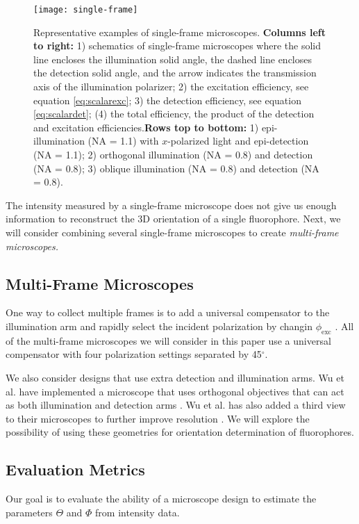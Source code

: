 \documentclass[10pt]{article}
\begin{document}
\begin{figure}[htbp]
\centering\texttt{[image: single-frame]}
\caption{Representative examples of single-frame microscopes.\newline \newline
  \textbf{Columns left to right:} 1) schematics of single-frame microscopes
  where the solid line encloses the illumination solid angle, the dashed line
  encloses the detection solid angle, and the arrow indicates the transmission
  axis of the illumination polarizer; 2) the excitation efficiency, see equation
  \ref{eq:scalarexc}; 3) the detection efficiency, see equation
  \ref{eq:scalardet}; (4) the total efficiency, the product of the detection and
  excitation efficiencies.\newline \newline \textbf{Rows top to bottom:} 1)
  epi-illumination (NA = 1.1) with $x$-polarized light and epi-detection (NA =
  1.1); 2) orthogonal illumination (NA = 0.8) and detection (NA = 0.8); 3)
  oblique illumination (NA = 0.8) and detection (NA = 0.8).}
  \label{fig:single-frame}
\end{figure}

The intensity measured by a single-frame microscope does not give us enough
information to reconstruct the 3D orientation of a single fluorophore. Next, we
will consider combining several single-frame microscopes to create
\emph{multi-frame microscopes.}

\subsection{Multi-Frame Microscopes}\label{designs}
One way to collect multiple frames is to add a universal compensator to the
illumination arm and rapidly select the incident polarization by changin
$\phi_{\text{exc}}$ \cite{oldenbourg1995}. All of the multi-frame microscopes we
will consider in this paper use a universal compensator with four polarization
settings separated by 45${}^{\circ}$.

We also consider designs that use extra detection and illumination arms. Wu et
al. have implemented a microscope that uses orthogonal objectives that can act
as both illumination and detection arms \cite{wu2013}. Wu et al. has also added
a third view to their microscopes to further improve resolution
\cite{wu2016}. We will explore the possibility of using these geometries for
orientation determination of fluorophores.

\subsection{Evaluation Metrics}\label{metrics}
Our goal is to evaluate the ability of a microscope design to estimate the
parameters $\Theta$ and $\Phi$ from intensity data. 
\end{document}
